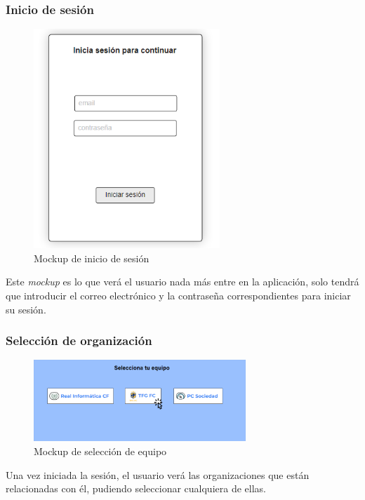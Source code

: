 \subsubsection{Inicio de sesión}
\begin{figure}[H]
    \centering
    \includegraphics[width=7cm]{archivos/tfg_jorge/mockups/login}
    \caption{Mockup de inicio de sesión}\label{sistemass2}
\end{figure}
Este \textit{mockup} es lo que verá el usuario nada más entre en la aplicación, solo tendrá que introducir el correo electrónico y la contraseña correspondientes para iniciar su sesión.
\subsubsection{Selección de organización}
\begin{figure}[H] 
    \centering
    \includegraphics[width=8cm]{archivos/tfg_jorge/mockups/seleccion_equipo}
    \caption{Mockup de selección de equipo}\label{sistemass2}
\end{figure}
Una vez iniciada la sesión, el usuario verá las organizaciones que están relacionadas con él, pudiendo seleccionar cualquiera de ellas.
